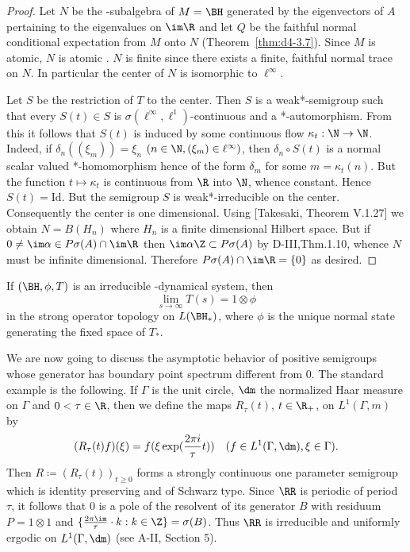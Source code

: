 \begin{proof}
Let $ N $  be the \WA-subalgebra of $ M = \BH $  generated by the eigenvectors of $ A $  pertaining to the eigenvalues on $ \im\R $  and let $ Q $  be the faithful normal conditional expectation from $ M $  onto $ N $  (Theorem~\ref{thm:d4-3.7}).
Since $ M $  is atomic, $ N $  is atomic \citet{störmer:1972}.
$ N $  is finite since there exists a finite, faithful normal trace on $ N $.
In particular the center of $ N $  is isomorphic to $ \ell^{\infty} $.

Let $ S $  be the restriction of $ T $  to the center.
Then $ S $  is a weak*-semigroup such that every $ S(t) \in S $  is $ \sigma(\ell^{\infty},\ell^{1}) $-continuous and a *-automorphism.
From this it follows that $ S(t) $  is induced by some continuous flow $ \kappa_{t}: \N \to \N $.
Indeed, if $ \delta_{n}((\xi_{m})) = \xi_{n} $  $ (n \in \N, (\xi_{m}) \in \ell^{\infty}) $, then $ \delta_{n} \circ S(t) $  is a normal scalar valued *-homomorphism hence of the form $ \delta_{m} $  for some $ m = \kappa_{t}(n) $.
But the function $ t \mapsto \kappa_{t} $  is continuous from $ \R $  into $ \N $, whence constant.
Hence $ S(t) = \text{Id} $.
But the semigroup $ S $  is weak*-irreducible on the center.
Consequently the center is one dimensional.
Using [Takesaki, Theorem V.1.27] we obtain $ N = B(H_{n}) $  where $ H_{n} $  is a finite dimensional Hilbert space.
But if $ 0 \neq \im\alpha \in P\sigma(A) \cap \im\R $  then $ \im\alpha\Z \subset P\sigma(A) $  by D-III,Thm.1.10, whence $ N $  must be infinite dimensional.
Therefore $ P\sigma(A) \cap \im\R = \{0\} $  as desired.
\end{proof}
\begin{corollary}\label{cor:d4-3.9}
If $ (\BH,\phi,T) $  is an irreducible \WA-dynamical system, then
\[
\lim_{s \to \infty} T(s) = 1 \otimes \phi
\]
in the strong operator topology on $ L(\BH_{*}) $, where $ \phi $  is the unique normal state generating the fixed space of $ T_{*} $.
\end{corollary}

We are now going to discuss the asymptotic behavior of positive semigroups whose generator has boundary point spectrum different from $ 0 $.
The standard example is the following.
If $ \Gamma $  is the unit circle, $ \dm $  the normalized Haar measure on $ \Gamma $  and $ 0 < \tau \in \R $, then we define the maps $ R_{\tau}(t) $, $ t \in \R_{+} $, on $ L^{1}(\Gamma,m) $  by
\[
(R_{\tau}(t)f)(\xi) = f(\xi\exp(\frac{2\pi i}{\tau}t)) \quad (f \in L^{1}(\Gamma,\dm), \xi \in \Gamma).
\]
Then $ R \coloneqq (R_{\tau}(t))_{t \geq 0} $  forms a strongly continuous one parameter semigroup which is identity preserving and of Schwarz type.
%
%
Since $ \RR $  is periodic of period $ \tau $, it follows that 0 is a pole of the resolvent of its generator $ B $  with residuum $ P = 1 \otimes 1 $  and $ \{\frac{2\pi \im}{\tau} \cdot k: k \in \Z\} = \sigma(B) $.
Thus $ \RR $  is irreducible and uniformly ergodic on $ L^{1}(\Gamma,\dm) $  (see A-II, Section 5).

